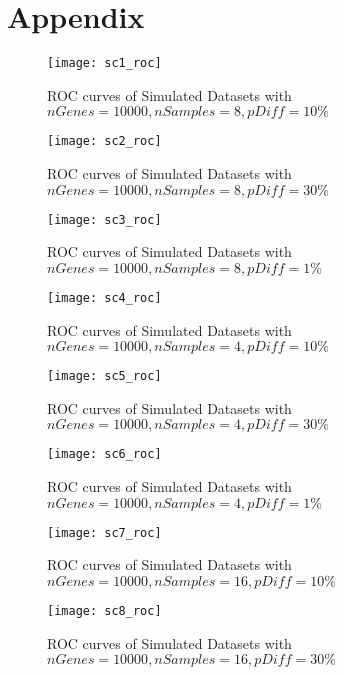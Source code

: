 \section{Appendix}

\begin{figure}[h!tb] 
\texttt{[image: sc1\_roc]}
\caption{ROC curves of Simulated Datasets with $nGenes=10000, nSamples=8, pDiff=10\%$}
\label{sc1_roc}
\end{figure}



\begin{figure}[h!tb] 
\texttt{[image: sc2\_roc]}
\caption{ROC curves of Simulated Datasets with $nGenes=10000, nSamples=8, pDiff=30\%$}
\label{sc2_roc}
\end{figure}

\begin{figure}[h!tb] 
\texttt{[image: sc3\_roc]}
\caption{ROC curves of Simulated Datasets with $nGenes=10000, nSamples=8, pDiff=1\%$}
\label{sc3_roc}
\end{figure}


\begin{figure}[h!tb] 
\texttt{[image: sc4\_roc]}
\caption{ROC curves of Simulated Datasets with $nGenes=10000, nSamples=4, pDiff=10\%$}
\label{sc4_roc}
\end{figure}


\begin{figure}[h!tb] 
\texttt{[image: sc5\_roc]}
\caption{ROC curves of Simulated Datasets with $nGenes=10000, nSamples=4, pDiff=30\%$}
\label{sc5_roc}
\end{figure}


\begin{figure}[h!tb] 
\texttt{[image: sc6\_roc]}
\caption{ROC curves of Simulated Datasets with $nGenes=10000, nSamples=4, pDiff=1\%$}
\label{sc6_roc}
\end{figure}

\begin{figure}[h!tb] 
\texttt{[image: sc7\_roc]}
\caption{ROC curves of Simulated Datasets with $nGenes=10000, nSamples=16, pDiff=10\%$}
\label{sc7_roc}
\end{figure}

\begin{figure}[h!tb] 
\texttt{[image: sc8\_roc]}
\caption{ROC curves of Simulated Datasets with $nGenes=10000, nSamples=16, pDiff=30\%$}
\label{sc8_roc}
\end{figure}

